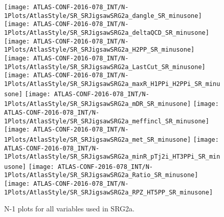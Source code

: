 \begin{figure}[tbp]
\begin{center}
\texttt{[image: ATLAS-CONF-2016-078\_INT/N-1Plots/AtlasStyle/SR\_SRJigsawSRG2a\_dangle\_SR\_minusone]}
\texttt{[image: ATLAS-CONF-2016-078\_INT/N-1Plots/AtlasStyle/SR\_SRJigsawSRG2a\_deltaQCD\_SR\_minusone]}
\texttt{[image: ATLAS-CONF-2016-078\_INT/N-1Plots/AtlasStyle/SR\_SRJigsawSRG2a\_H2PP\_SR\_minusone]}
\texttt{[image: ATLAS-CONF-2016-078\_INT/N-1Plots/AtlasStyle/SR\_SRJigsawSRG2a\_LastCut\_SR\_minusone]}
\texttt{[image: ATLAS-CONF-2016-078\_INT/N-1Plots/AtlasStyle/SR\_SRJigsawSRG2a\_maxR\_H1PPi\_H2PPi\_SR\_minusone]}
\texttt{[image: ATLAS-CONF-2016-078\_INT/N-1Plots/AtlasStyle/SR\_SRJigsawSRG2a\_mDR\_SR\_minusone]}
\texttt{[image: ATLAS-CONF-2016-078\_INT/N-1Plots/AtlasStyle/SR\_SRJigsawSRG2a\_meffincl\_SR\_minusone]}
\texttt{[image: ATLAS-CONF-2016-078\_INT/N-1Plots/AtlasStyle/SR\_SRJigsawSRG2a\_met\_SR\_minusone]}
\texttt{[image: ATLAS-CONF-2016-078\_INT/N-1Plots/AtlasStyle/SR\_SRJigsawSRG2a\_minR\_pTj2i\_HT3PPi\_SR\_minusone]}
\texttt{[image: ATLAS-CONF-2016-078\_INT/N-1Plots/AtlasStyle/SR\_SRJigsawSRG2a\_Ratio\_SR\_minusone]}
\texttt{[image: ATLAS-CONF-2016-078\_INT/N-1Plots/AtlasStyle/SR\_SRJigsawSRG2a\_RPZ\_HT5PP\_SR\_minusone]}
\end{center}
\caption{N-1 plots for all variables used in SRG2a.}
\label{fig:SR_SRJigsawSRG2a_dangle_SR_minusone}
\end{figure}

